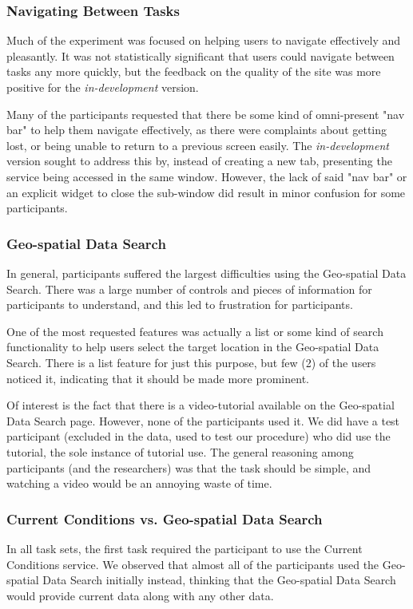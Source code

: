 \documentclass{acm_proc_article-sp}
\begin{document}
\subsubsection{Navigating Between Tasks}
Much of the experiment was focused on helping users to navigate effectively and pleasantly. It was not statistically significant that users could navigate between tasks any more quickly, but the feedback on the quality of the site was more positive for the \emph{in-development} version.

Many of the participants requested that there be some kind of omni-present "nav bar" to help them navigate effectively, as there were complaints about getting lost, or being unable to return to a previous screen easily. The \emph{in-development} version sought to address this by, instead of creating a new tab, presenting the service being accessed in the same window. However, the lack of said "nav bar" or an explicit widget to close the sub-window did result in minor confusion for some participants.

\subsubsection{Geo-spatial Data Search}
In general, participants suffered the largest difficulties using the Geo-spatial Data Search. There was a large number of controls and pieces of information for participants to understand, and this led to frustration for participants.

One of the most requested features was actually a list or some kind of search functionality to help users select the target location in the Geo-spatial Data Search. There is a list feature for just this purpose, but few (2) of the users noticed it, indicating that it should be made more prominent.

Of interest is the fact that there is a video-tutorial available on the Geo-spatial Data Search page. However, none of the participants used it. We did have a test participant (excluded in the data, used to test our procedure) who did use the tutorial, the sole instance of tutorial use. The general reasoning among participants (and the researchers) was that the task should be simple, and watching a video would be an annoying waste of time.

\subsubsection{Current Conditions vs. Geo-spatial Data Search}
In all task sets, the first task required the participant to use the Current Conditions service. We observed that almost all of the participants used the Geo-spatial Data Search initially instead, thinking that the Geo-spatial Data Search would provide current data along with any other data.
\end{document}
